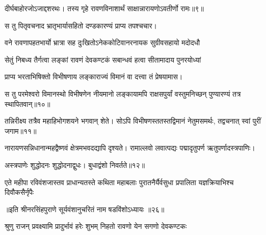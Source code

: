 
\vakta{}
\shrota{}
\notes{}

\storymeta


\addtocounter{shlokacount}{8}


दीर्घबाहोरजोऽजाद्दशरथः। तस्य गृहे रावणविनाशार्थं साक्षान्नारायणोऽवतीर्णो रामः॥९॥

स तु पितृवचनाद भ्रातृभार्यासहितो दण्डकारण्यं प्राप्य तपश्चचार।

वने रावणापहतभार्यो भ्रात्रा सह दुःखितोऽनेककोटिवानरनायक सुग्रीवसहायो मदोदधौ

सेतुं निबध्य तैर्गत्वा लङ्कां रावणं देवकण्टकं सबान्धवं हत्वा सीतामादाय पुनरयोध्यां

प्राप्य भरताभिषिक्तो विभीषणाय लङ्काराज्यं विमानं वा दत्त्वा तं प्रेषयामास।

स तु परमेश्वरो विमानस्थो विभीषणेन नीयमानो लङ्कायामपि राक्षसपुर्यां वस्तुमनिच्छन् पुण्यारण्यं तत्र स्थापितवान्॥१०॥

तन्निरीक्ष्य तत्रैव महाहिभोगशयने भगवान् शेते। सोऽपि विभीषणस्ततस्तद्विमानं नेतुमसमर्थः, तद्वचनात् स्वां पुरीं जगाम॥११॥

नारायणसन्निधानान्महद्वैष्णवं क्षेत्रमभवदद्यापि दृश्यते। रामाल्लवो लवात्पद्यः पद्मादृतुपर्ण ऋतुपर्णादस्त्रपाणिः।

अस्त्रपाणेः शुद्धोदनः शुद्धोदनाद्वुधः। बुधाद्वंशो निवर्तते॥१२॥

\twolineshloka
{एते महीपा रविवंशजास्तव प्राधान्यतस्ते कथिता महाबलाः}
{पुरातनैर्यैर्वसुधा प्रपालिता यज्ञक्रियाभिश्च दिवौकसैर्नृपैः} %

॥इति श्रीनरसिंहपुराणे सूर्यवंशानुचरितं नाम षडविंशोऽध्यायः ॥२६॥


\vakta{}
\shrota{}

\storymeta




\twolineshloka
{श्रुणु राजन् प्रवक्ष्यामि प्रादुर्भावं हरेः शुभम्}
{निहतो रावणो येन सगणो देवकण्टकः} %

